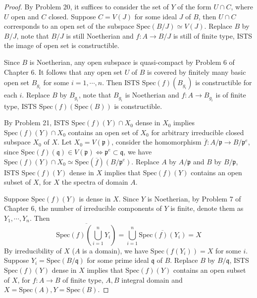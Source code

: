 \documentclass{solution}
\begin{document}
\begin{proof}
    By Problem 20, it suffices to consider the set of $Y$ of the form $U \cap C$, where $U$ open and $C$ closed. Suppose $C = V(J)$ for some ideal $J$ of $B$, then $U \cap C$ corresponds to an open set of the subspace $\mathrm{Spec}(B / J) \simeq V(J)$. Replace $B$ by $B / J$, note that $B / J$ is still Noetherian and $f: A \rightarrow B / J$ is still of finite type, ISTS the image of open set is constructible.

    Since $B$ is Noetherian, any open subspace is quasi-compact by Problem 6 of Chapter 6. It follows that any open set $U$ of $B$ is covered by finitely many basic open set $B_{g_i}$ for some $i = 1, \cdots, n$. Then ISTS $\mathrm{Spec}(f)(B_{g_i})$ is constructible for each $i$. Replace $B$ by $B_{g_i}$, note that $B_{g_i}$ is Noetherian and $f: A \rightarrow B_{g_i}$ is of finite type, ISTS $\mathrm{Spec}(f)(\mathrm{Spec}(B))$ is constructible.

    By Problem 21, ISTS $\mathrm{Spec}(f)(Y) \cap X_0$ dense in $X_0$ implies $\mathrm{Spec}(f)(Y) \cap X_0$ contains an open set of $X_0$ for arbitrary irreducible closed subspace $X_0$ of $X$. Let $X_0 = V(\mathfrak{p})$, consider the homomorphism $\overline{f}: A / \mathfrak{p} \rightarrow B / \mathfrak{p}^e$, since $\mathrm{Spec}(f)(\mathfrak{q}) \in V(\mathfrak{p}) \Leftrightarrow \mathfrak{p}^e \subset \mathfrak{q}$, we have $\mathrm{Spec}(f)(Y) \cap X_0 \simeq \mathrm{Spec}(\overline{f})(B / \mathfrak{p}^e)$. Replace $A$ by $A / \mathfrak{p}$ and $B$ by $B / \mathfrak{p}$, ISTS $\mathrm{Spec}(f)(Y)$ dense in $X$ implies that $\mathrm{Spec}(f)(Y)$ contains an open subset of $X$, for $X$ the spectra of domain $A$.

    Suppose $\mathrm{Spec}(f)(Y)$ is dense in $X$. Since $Y$ is Noetherian, by Problem 7 of Chapter 6, the number of irreducible components of $Y$ is finite, denote them as $Y_1, \cdots, Y_n$. Then
    $$\overline{\mathrm{Spec}(f) \left(\bigcup\limits_{i = 1}^{n} Y_i\right)} = \bigcup\limits_{i = 1}^{n} \overline{\mathrm{Spec}(f)(Y_i)} = X$$
    By irreducibility of $X$ ($A$ is a domain), we have $\mathrm{Spec}(f(Y_i)) = X$ for some $i$. Suppose $Y_i = \mathrm{Spec}(B / \mathfrak{q})$ for some prime ideal $\mathfrak{q}$ of $B$. Replace $B$ by $B / \mathfrak{q}$, ISTS $\mathrm{Spec}(f)(Y)$ dense in $X$ implies that $\mathrm{Spec}(f)(Y)$ contains an open subset of $X$, for $f: A \rightarrow B$ of finite type, $A, B$ integral domain and $X = \mathrm{Spec}(A), Y = \mathrm{Spec}(B)$.


\end{proof}
\end{document}
